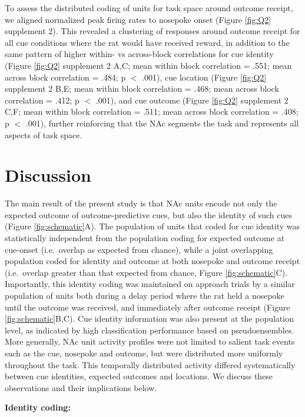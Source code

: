 \documentclass[11pt]{article}
\begin{document}
To assess the distributed coding of units for task space around outcome receipt, we aligned normalized peak firing rates to nosepoke onset (Figure \ref{fig:Q2} supplement 2). This revealed a clustering of responses around outcome receipt for all cue conditions where the rat would have received reward, in addition to the same pattern of higher within- vs across-block correlations for cue identity (Figure \ref{fig:Q2} supplement 2 A,C; mean within block correlation = .551; mean across block correlation = .484; p $<$ .001), cue location (Figure \ref{fig:Q2} supplement 2 B,E; mean within block correlation = .468; mean across block correlation = .412; p $<$ .001), and cue outcome (Figure \ref{fig:Q2} supplement 2 C,F; mean within block correlation = .511; mean across block correlation = .408; p $<$ .001), further reinforcing that the NAc segments the task and represents all aspects of task space.

\section*{Discussion}

The main result of the present study is that NAc units encode not only
the expected outcome of outcome-predictive cues, but also the identity
of such cues (Figure \ref{fig:schematic}A). The population of units
that coded for cue identity was statistically independent from the
population coding for expected outcome at cue-onset (i.e.\ overlap as
expected from chance), while a joint overlapping population coded for
identity and outcome at both nosepoke and outcome receipt
(i.e.\ overlap greater than that expected from chance, Figure
\ref{fig:schematic}C). Importantly, this identity coding was
maintained on approach trials by a similar population of units both
during a delay period where the rat held a nosepoke until the outcome
was received, and immediately after outcome receipt (Figure
\ref{fig:schematic}B,C). Cue identity information was also present at
the population level, as indicated by high classification performance
based on pseudoensembles. More generally, NAc unit activity profiles
were not limited to salient task events such as the cue, nosepoke and
outcome, but were distributed more uniformly throughout the task. This
temporally distributed activity differed systematically between cue
identities, expected outcomes and locations. We discuss these
observations and their implications below.

{\bf Identity coding:}
\end{document}
